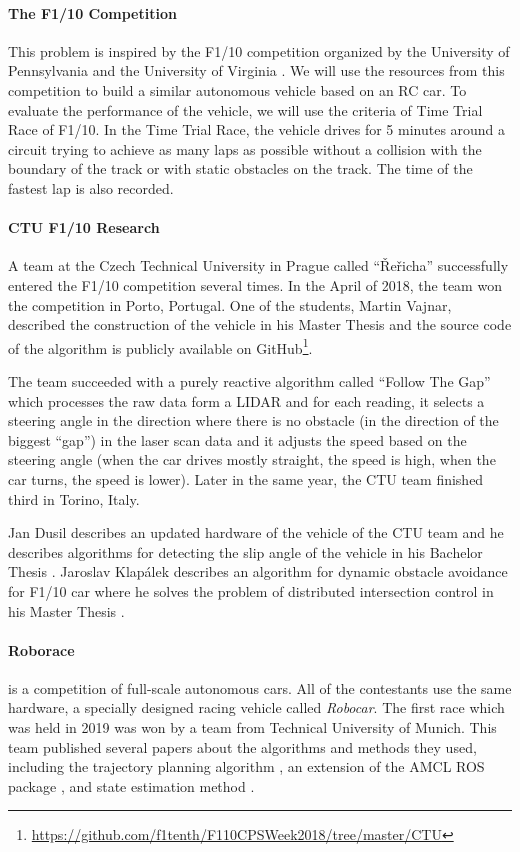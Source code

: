 \paragraph{The F1/10 Competition}

This problem is inspired by the F1/10 competition organized by the University of Pennsylvania and the University of Virginia \cite{F1/10_web}. We will use the resources from this competition to build a similar autonomous vehicle based on an RC car. To evaluate the performance of the vehicle, we will use the criteria of Time Trial Race of F1/10. In the Time Trial Race, the vehicle drives for 5 minutes around a circuit trying to achieve as many laps as possible without a collision with the boundary of the track or with static obstacles on the track. The time of the fastest lap is also recorded.

\paragraph{CTU F1/10 Research} A team at the Czech Technical University in Prague called ``Řeřicha'' successfully entered the F1/10 competition several times. In the April of 2018, the team won the competition in Porto, Portugal. One of the students, Martin Vajnar, described the construction of the vehicle in his Master Thesis \cite{ctu_martin_vajnar} and the source code of the algorithm is publicly available on GitHub\footnote{\url{https://github.com/f1tenth/F110CPSWeek2018/tree/master/CTU}}.

The team succeeded with a purely reactive algorithm called ``Follow The Gap'' which processes the raw data form a LIDAR and for each reading, it selects a steering angle in the direction where there is no obstacle (in the direction of the biggest ``gap'') in the laser scan data and it adjusts the speed based on the steering angle (when the car drives mostly straight, the speed is high, when the car turns, the speed is lower). Later in the same year, the CTU team finished third in Torino, Italy.

Jan Dusil describes an updated hardware of the vehicle of the CTU team and he describes algorithms for detecting the slip angle of the vehicle in his Bachelor Thesis \cite{ctu_jan_dusil}. Jaroslav Klapálek describes an algorithm for dynamic obstacle avoidance for F1/10 car where he solves the problem of distributed intersection control in his Master Thesis \cite{ctu_jaroslav_klapalek}.

\paragraph{Roborace} is a competition of full-scale autonomous cars. All of the contestants use the same hardware, a specially designed racing vehicle called \textit{Robocar}. The first race which was held in 2019 was won by a team from Technical University of Munich. This team published several papers about the algorithms and methods they used, including the trajectory planning algorithm \cite{tum_roborace_planning}, an extension of the AMCL ROS package \cite{tum_roborace_ros}, and state estimation method \cite{tum_roborace_state_estimation}.